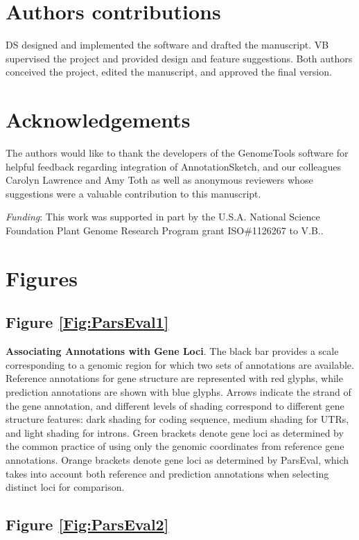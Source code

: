 \section{Authors contributions}
DS designed and implemented the software and drafted the manuscript.
VB supervised the project and provided design and feature suggestions.
Both authors conceived the project, edited the manuscript, and approved the final version.


\section{Acknowledgements}
The authors would like to thank the developers of the GenomeTools software for helpful feedback regarding integration of AnnotationSketch, and our colleagues Carolyn Lawrence and Amy Toth as well as anonymous reviewers whose suggestions were a valuable contribution to this manuscript.

\emph{Funding}: This work was supported in part by the U.S.A. National Science Foundation Plant Genome Research Program grant ISO\#1126267 to V.B..

\newpage

\section{Figures}

\subsection*{Figure \ref{Fig:ParsEval1}}

\noindent
\textbf{Associating Annotations with Gene Loci}.
The black bar provides a scale corresponding to a genomic region for which two sets of
annotations are available. Reference annotations for gene structure are represented with red glyphs, while prediction annotations are shown with
blue glyphs. Arrows indicate the strand of the gene annotation, and different levels of shading correspond to different gene structure features: dark
shading for coding sequence, medium shading for UTRs, and light shading for introns. Green brackets denote gene loci as determined by the
common practice of using only the genomic coordinates from reference gene annotations. Orange brackets denote gene loci as determined by
ParsEval, which takes into account both reference and prediction annotations when selecting distinct loci for comparison.

\subsection*{Figure \ref{Fig:ParsEval2}}

